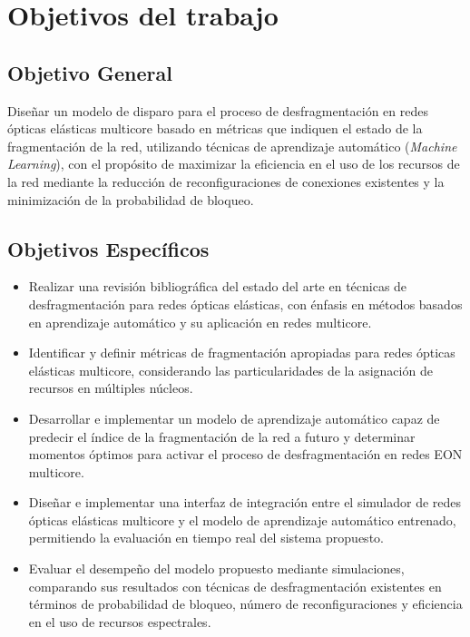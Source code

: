 \section{Objetivos del trabajo}
\subsection{Objetivo General}
Diseñar un modelo de disparo para el proceso de desfragmentación en redes ópticas elásticas multicore basado en métricas que indiquen el estado de la fragmentación de la red, utilizando técnicas de aprendizaje automático (\textit{Machine Learning}), con el propósito de maximizar la eficiencia en el uso de los recursos de la red mediante la reducción de reconfiguraciones de conexiones existentes y la minimización de la probabilidad de bloqueo. 

\subsection{Objetivos Específicos}
\begin{itemize}
    \item Realizar una revisión bibliográfica del estado del arte en técnicas de desfragmentación para redes ópticas elásticas, con énfasis en métodos basados en aprendizaje automático y su aplicación en redes multicore.

    \item Identificar y definir métricas de fragmentación apropiadas para redes ópticas elásticas multicore, considerando las particularidades de la asignación de recursos en múltiples núcleos.
    
    \item Desarrollar e implementar un modelo de aprendizaje automático capaz de predecir el índice de la fragmentación de la red a futuro y determinar momentos óptimos para activar el proceso de desfragmentación en redes EON multicore.
    
    \item Diseñar e implementar una interfaz de integración entre el simulador de redes ópticas elásticas multicore y el modelo de aprendizaje automático entrenado, permitiendo la evaluación en tiempo real del sistema propuesto.
    
    \item Evaluar el desempeño del modelo propuesto mediante simulaciones, comparando sus resultados con técnicas de desfragmentación existentes en términos de probabilidad de bloqueo, número de reconfiguraciones y eficiencia en el uso de recursos espectrales.
\end{itemize}

